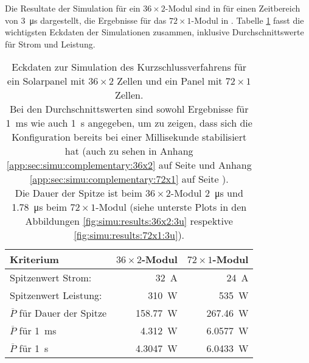 Die    Resultate   der    Simulation   f\"ur    ein   $36    \times   2$-Modul
sind   in      f\"ur  einen   Zeitbereich   von
\SI{3}{\micro\second}  dargestellt,  die  Ergebnisse   f\"ur  das  $72  \times
1$-Modul in .  Tabelle \ref{tab:36x2:72x1:heat}
fasst   die  wichtigsten   Eckdaten  der   Simulationen  zusammen,   inklusive
Durchschnittswerte f\"ur Strom und Leistung.

\begin{table}[h!tb]
    \centering
    \caption{%
        Eckdaten zur Simulation des Kurzschlussverfahrens f\"ur ein Solarpanel
        mit  $36   \times  2$  Zellen  und   ein  Panel  mit  $72   \times  1$
        Zellen.\protect\\
        Bei     den     Durchschnittswerten     sind     sowohl     Ergebnisse
        f\"ur      \SI{1}{\milli\second}     wie      auch     \SI{1}{\second}
        angegeben,    um   zu    zeigen,   dass    sich   die    Konfiguration
        bereits    bei    einer    Millisekunde   stabilisiert    hat    (auch
        zu     sehen    in     Anhang    \ref{app:sec:simu:complementary:36x2}
        auf      Seite      \pageref{app:sec:simu:complementary:36x2}      und
        Anhang      \ref{app:sec:simu:complementary:72x1}       auf      Seite
        \pageref{app:sec:simu:complementary:72x1}).\protect\\
        Die     Dauer      der     Spitze     ist     beim      $36     \times
        2$-Modul     \SI{2}{\micro\second}    und     \SI{1.78}{\micro\second}
        beim    $72    \times    1$-Modul    (siehe    unterste    Plots    in
        den     Abbildungen      \ref{fig:simu:results:36x2:3u}     respektive
        \ref{fig:simu:results:72x1:3u}).%
    }
    \label{tab:36x2:72x1:heat}
    \begin{tabular}{lrr}

    \toprule
    Kriterium                                      & $36 \times 2$-Modul & $72 \times 1$-Modul \\
    \midrule
     Spitzenwert Strom:                            & \SI{32}{\ampere}    & \SI{24}{\ampere}    \\
     Spitzenwert Leistung:                         & \SI{310}{\watt}     & \SI{535}{\watt}     \\
     $\overline{P}$ f\"ur Dauer der Spitze         & \SI{158.77}{\watt}  & \SI{267.46}{\watt}  \\
     $\overline{P}$ f\"ur \SI{1}{\milli\second}    & \SI{4.312}{\watt}   & \SI{6.0577}{\watt}  \\
     $\overline{P}$ f\"ur \SI{1}{\second}          & \SI{4.3047}{\watt}  & \SI{6.0433}{\watt}  \\
    \bottomrule
    \end{tabular}
\end{table}

